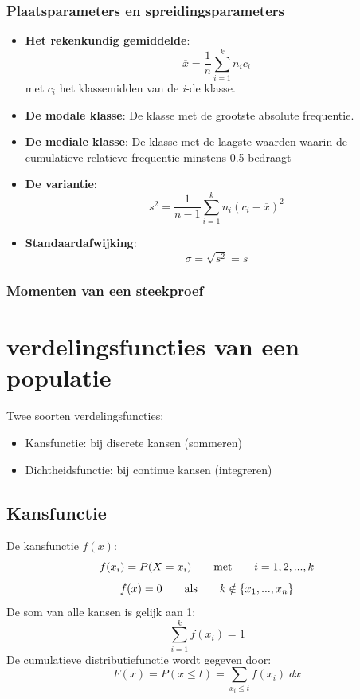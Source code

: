 \documentclass[12pt]{report}
\newcommand{\todo}[1]{
  {\color{red}\textunderscore{\textit{TODO: #1}}}
}
\begin{document}
\subsection{Plaatsparameters en spreidingsparameters}
\begin{itemize}
	\item {\textbf{Het rekenkundig gemiddelde}: 
		$$\overline{x} = \frac{1}{n}\sum_{i=1}^{k}n_ic_i$$
		met $c_i$ het klassemidden van de \textit{i}-de klasse.
	}
	\item {\textbf{De modale klasse}: De klasse met de grootste absolute frequentie.}
	\item {\textbf{De mediale klasse}: De klasse met de laagste waarden waarin de cumulatieve relatieve frequentie minstens 0.5 bedraagt}
	\item {\textbf{De variantie}:
		$$s^2 = \frac{1}{n-1}\sum_{i=1}^{k}n_i(c_i-\overline{x})^2$$
	}
	\item {\textbf{Standaardafwijking}:
		$$\sigma = \sqrt{s^2} = s$$}
\end{itemize}

\subsection{Momenten van een steekproef}
\todo{epic}

\chapter{verdelingsfuncties van een populatie}
Twee soorten verdelingsfuncties:
\begin{itemize}
	\item Kansfunctie: bij discrete kansen (sommeren)
	\item Dichtheidsfunctie: bij continue kansen (integreren)
\end{itemize}
\section{Kansfunctie}
De kansfunctie $f(x)$:
$$f(x_i) = P(X = x_i) \qquad \hbox{met}\qquad i = 1, 2, ..., k$$
$$f(x) = 0 \qquad \hbox{als} \qquad k \notin \{x_1, ..., x_n\}$$
De som van alle kansen is gelijk aan 1:
$$\sum_{i = 1}^{k} f(x_i) = 1$$
De cumulatieve distributiefunctie wordt gegeven door:
$$F(x) = P(x \leq t) = \sum_{x_i \leq t} f(x_i)\;dx$$
\end{document}
